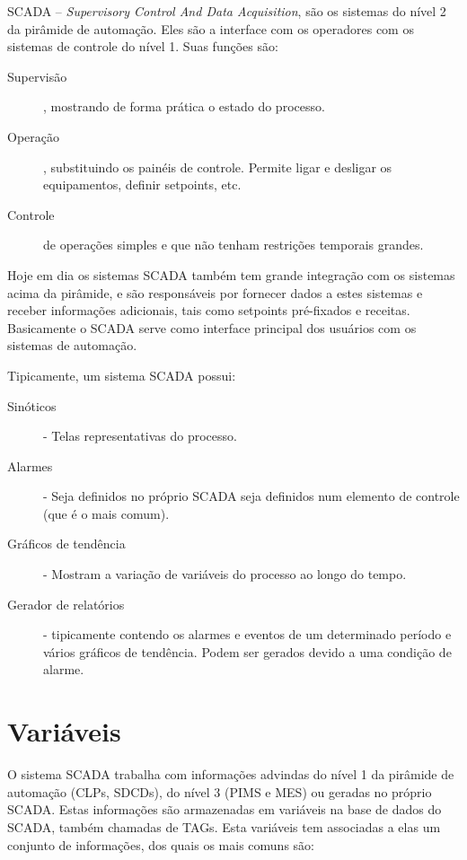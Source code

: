 
SCADA -- \emph{Supervisory Control And Data Acquisition}, são os sistemas do nível 2 da pirâmide de automação. Eles são a interface com os operadores com os sistemas de controle do nível 1. Suas funções são:

\begin{description}
\item[Supervisão], mostrando de forma prática o estado do processo.
\item[Operação], substituindo os painéis de controle. Permite ligar e desligar os equipamentos, definir setpoints, etc.
\item[Controle] de operações simples e que não tenham restrições temporais grandes.
\end{description}

Hoje em dia os sistemas SCADA também tem grande integração com os sistemas acima da pirâmide, e são responsáveis por fornecer dados a estes sistemas e receber informações adicionais, tais como setpoints pré-fixados e receitas. Basicamente o SCADA serve como interface principal dos usuários com os sistemas de automação.

Tipicamente, um sistema SCADA possui:
\begin{description}
	\item[Sinóticos] - Telas representativas do processo.
	\item[Alarmes] - Seja definidos no próprio SCADA seja definidos num elemento de controle (que é o mais comum).
	\item[Gráficos de tendência] - Mostram a variação de variáveis do processo ao longo do tempo.
	\item[Gerador de relatórios] - tipicamente contendo os alarmes e eventos de um determinado período e vários gráficos de tendência. Podem ser gerados devido a uma condição de alarme.
\end{description}

\section{Variáveis}
O sistema SCADA trabalha com informações advindas do nível 1 da pirâmide de automação (CLPs, SDCDs), do nível 3 (PIMS e MES) ou geradas no próprio SCADA. Estas informações são armazenadas em variáveis na base de dados do SCADA, também chamadas de TAGs. Esta variáveis tem associadas a elas um conjunto de informações, dos quais os mais comuns são:

